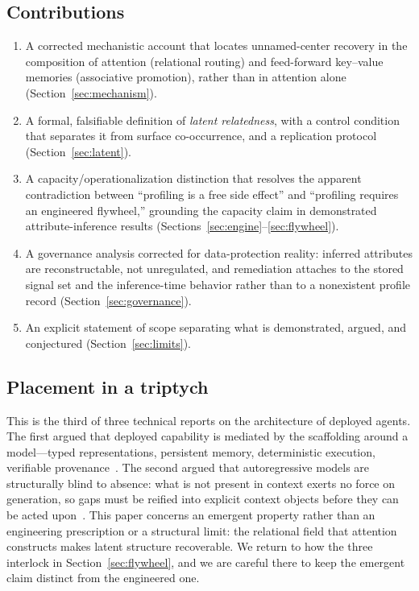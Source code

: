 \documentclass[conference]{IEEEtran}
\theoremstyle{definition}
\begin{document}
\subsection{Contributions}
\begin{enumerate}
  \item A corrected mechanistic account that locates unnamed-center recovery in the composition of attention (relational routing) and feed-forward key--value memories (associative promotion), rather than in attention alone (Section~\ref{sec:mechanism}).
  \item A formal, falsifiable definition of \emph{latent relatedness}, with a control condition that separates it from surface co-occurrence, and a replication protocol (Section~\ref{sec:latent}).
  \item A capacity/operationalization distinction that resolves the apparent contradiction between ``profiling is a free side effect'' and ``profiling requires an engineered flywheel,'' grounding the capacity claim in demonstrated attribute-inference results (Sections~\ref{sec:engine}--\ref{sec:flywheel}).
  \item A governance analysis corrected for data-protection reality: inferred attributes are reconstructable, not unregulated, and remediation attaches to the stored signal set and the inference-time behavior rather than to a nonexistent profile record (Section~\ref{sec:governance}).
  \item An explicit statement of scope separating what is demonstrated, argued, and conjectured (Section~\ref{sec:limits}).
\end{enumerate}

\subsection{Placement in a triptych}
This is the third of three technical reports on the architecture of deployed agents. The first argued that deployed capability is mediated by the scaffolding around a model---typed representations, persistent memory, deterministic execution, verifiable provenance~\cite{scaffolding}. The second argued that autoregressive models are structurally blind to absence: what is not present in context exerts no force on generation, so gaps must be reified into explicit context objects before they can be acted upon~\cite{absence}. This paper concerns an emergent property rather than an engineering prescription or a structural limit: the relational field that attention constructs makes latent structure recoverable. We return to how the three interlock in Section~\ref{sec:flywheel}, and we are careful there to keep the emergent claim distinct from the engineered one.
\end{document}
